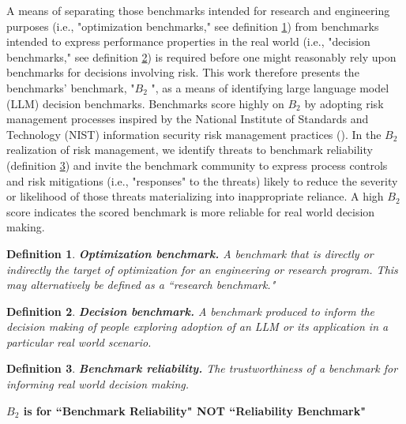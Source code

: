 \documentclass{article}
\newtheorem{dfn}{Definition}[section]
\newcommand\bb{$B_2$ }
\begin{document}
A means of separating those benchmarks intended for research and engineering purposes (i.e., "optimization benchmarks," see definition \ref{dfn:optimization_benchmark}) from benchmarks intended to express performance properties in the real world (i.e., "decision benchmarks," see definition \ref{dfn:decision_benchmark}) is required before one might reasonably rely upon benchmarks for decisions involving risk. This work therefore presents the benchmarks' benchmark, "\bb", as a means of identifying large language model (LLM) decision benchmarks. Benchmarks score highly on \bb by adopting risk management processes inspired by the National Institute of Standards and Technology (NIST) information security risk management practices (\cite{nist80030r1}). In the \bb realization of risk management, we identify threats to benchmark reliability (definition \ref{dfn:benchmark_reliability}) and invite the benchmark community to express process controls and risk mitigations (i.e., "responses" to the threats) likely to reduce the severity or likelihood of those threats materializing into inappropriate reliance. A high \bb score indicates the scored benchmark is more reliable for real world decision making.

\begin{dfn}
\label{dfn:optimization_benchmark}
{\bf Optimization benchmark.} A benchmark that is directly or indirectly the target of optimization for an engineering or research program. This may alternatively be defined as a ``research benchmark."
\end{dfn}

\begin{dfn}
\label{dfn:decision_benchmark}
{\bf Decision benchmark.} A benchmark produced to inform the decision making of people exploring adoption of an LLM or its application in a particular real world scenario.
\end{dfn}

\begin{dfn}
\label{dfn:benchmark_reliability}
{\bf Benchmark reliability.} The trustworthiness of a benchmark for informing real world decision making.
\end{dfn}

\begin{center}
    \begin{tcolorbox}[colback=blue!10, colframe=blue!50, width=\textwidth, boxrule=0.5mm, sharp corners, coltext=black, halign=center]
        \bf \bb is for ``Benchmark Reliability" NOT ``Reliability Benchmark"
    \end{tcolorbox}
\end{center}
\end{document}
